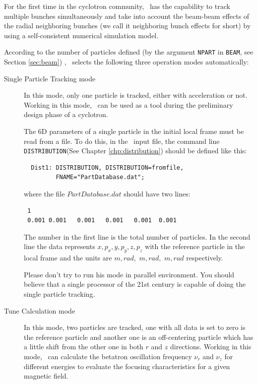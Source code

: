 For the first time in the cyclotron community, \opalcycl\ has the capability to track multiple bunches simultaneously
and take into account the beam-beam effects of the radial neighboring bunches (we call it neighboring bunch effects for short)
by using a self-consistent numerical simulation model.

According to the number of particles defined (by the argument \texttt{NPART} in \texttt{BEAM}, see Section \ref{sec:beam}) , 
\opalcycl\ selects the following three operation modes automatically:

\begin{description}

\item[Single Particle Tracking mode]

  In this mode, only one particle is tracked, either with acceleration or not.  Working in this mode, \opalcycl\
  can be used as a tool during the preliminary design phase of a cyclotron.  

  The 6D parameters of a single particle in the initial local frame must be read from a file. To do this, in the \opal\ input file, 
  the command line \texttt{DISTRIBUTION}(See Chapter \ref{chp:distribution}) should be defined like this:
\begin{verbatim}
  Dist1: DISTRIBUTION, DISTRIBUTION=fromfile,
         FNAME="PartDatabase.dat";
\end{verbatim}
 where the file $PartDatabase.dat$ should have two lines:
\begin{verbatim}
 1
 0.001 0.001   0.001   0.001   0.001  0.001    
\end{verbatim}
The number in the first line is the total number of particles.
In the second line the data represents $x, p_x, y,$$ p_y, z, p_z$ with the reference particle 
in the local frame and the units are $m, rad,$ $ m,rad,$ $ m, rad$ respectively.

Please don't try to run his mode in parallel environment. You should believe that a single processor of the 21st century is capable of doing
the single particle tracking.  

\item[Tune Calculation mode]

  In this mode, two particles are tracked, one with all data is set to zero is the reference particle and another one is an off-centering particle 
  which has a little shift from the other one in both $r$ and $z$ directions. Working in this mode, \opalcycl\ can 
  calculate the betatron oscillation frequency $\nu_r$ and $\nu_z$ for different energies to evaluate the focusing characteristics 
  for a given magnetic field.


\end{description}
